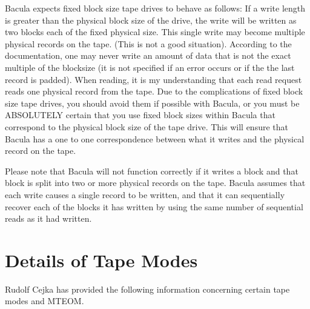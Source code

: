 Bacula expects fixed block size tape drives to behave as follows: If a write
length is greater than the physical block size of the drive, the write will be
written as two blocks each of the fixed physical size. This single write may
become multiple physical records on the tape. (This is not a good situation).
According to the documentation, one may never write an amount of data that is
not the exact multiple of the blocksize (it is not specified if an error
occurs or if the the last record is padded). When reading, it is my
understanding that each read request reads one physical record from the tape.
Due to the complications of fixed block size tape drives, you should avoid
them if possible with Bacula, or you must be ABSOLUTELY certain that you use
fixed block sizes within Bacula that correspond to the physical block size of
the tape drive. This will ensure that Bacula has a one to one correspondence
between what it writes and the physical record on the tape. 

Please note that Bacula will not function correctly if it writes a block and
that block is split into two or more physical records on the tape. Bacula
assumes that each write causes a single record to be written, and that it can
sequentially recover each of the blocks it has written by using the same
number of sequential reads as it had written. 

\section{Details of Tape Modes}
Rudolf Cejka has provided the following information concerning
certain tape modes and MTEOM.

